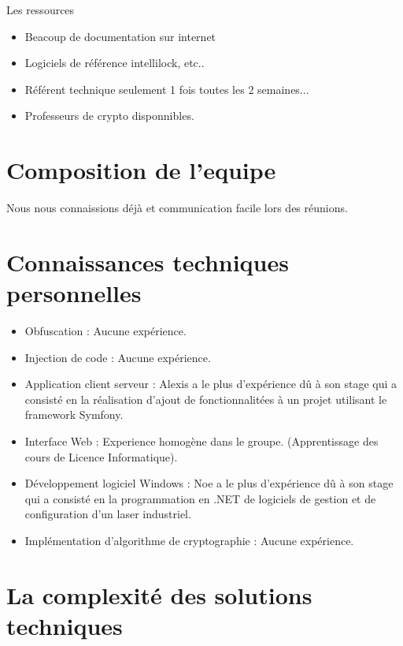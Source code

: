 Les ressources
\begin{itemize}
	\item Beacoup de documentation sur internet
	\item Logiciels de référence intellilock, etc..
	\item Référent technique seulement 1 fois toutes les 2 semaines...
	\item Professeurs de crypto disponnibles.\newline
\end{itemize}

\section{Composition de l'equipe}
Nous nous connaissions déjà et communication facile lors des réunions.

\section{Connaissances techniques personnelles}
\begin{itemize}
	\item Obfuscation : Aucune expérience.\newline
	\item Injection de code : Aucune expérience.\newline
	\item Application client serveur : Alexis a le plus d'expérience dû à son stage qui a consisté en la réalisation 
		  	d'ajout de fonctionnalitées à un projet utilisant le framework Symfony.\newline
	\item Interface Web : Experience homogène dans le groupe. (Apprentissage des cours de Licence Informatique).\newline
	\item Développement logiciel Windows : Noe a le plus d'expérience dû à son stage qui a consisté en la programmation en 
			.NET de logiciels de gestion et de configuration d'un laser industriel.\newline
	\item Implémentation d'algorithme de cryptographie : Aucune expérience.
\end{itemize}

\section{La complexité des solutions techniques}

